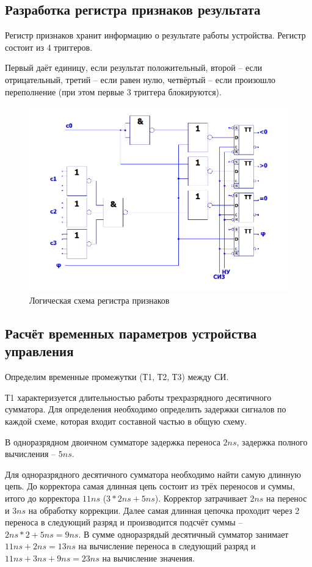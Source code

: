 \documentclass[a4paper,14pt]{article}
\begin{document}
\subsection{Разработка регистра признаков результата}

Регистр признаков хранит информацию о результате работы устройства.
Регистр состоит из 4 триггеров.

Первый даёт единицу, если результат положительный, второй -- если отрицательный, третий -- если равен нулю, четвёртый -- если произошло переполнение (при этом первые 3 триггера блокируются).

\begin{figure}[H]
	\centering
	\includegraphics[width=\linewidth]{schemas/prop}
	\caption{Логическая схема регистра признаков}
	\label{fig:prop}
\end{figure}
\subsection{Расчёт временных параметров устройства управления}

Определим временные промежутки (Т1, Т2, Т3) между СИ.

Т1 характеризуется длительностью работы трехразрядного десятичного сумматора.
Для определения необходимо определить задержки сигналов по каждой схеме, которая входит составной частью в общую схему.

В одноразрядном двоичном сумматоре задержка переноса $2ns$, задержка полного вычисления -- $5ns$.

Для одноразрядного десятичного сумматора необходимо найти самую длинную цепь. До корректора самая длинная цепь состоит из трёх переносов и суммы, итого до корректора $11ns$ ($3 * 2ns + 5ns$).
Корректор затрачивает $2ns$ на перенос и $3ns$ на обработку коррекции. 
Далее самая длинная цепочка проходит через 2 переноса в следующий разряд и производится подсчёт суммы -- $2ns * 2 + 5ns = 9ns$.
В сумме одноразрядый десятичный сумматор занимает $11ns + 2ns = 13ns$ на вычисление переноса в следующий разряд и $11ns +3ns + 9ns = 23 ns$ на вычисление значения.
\end{document}

